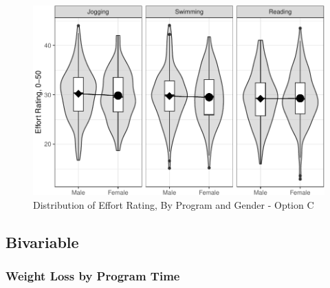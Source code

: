 \documentclass[
]{article}
\begin{document}
\begin{figure}[hb]

\includegraphics{Appendix_ex_weightloss_files/figure-latex/unnamed-chunk-61-1} \hfill{}

\caption{Distribution of Effort Rating, By Program and Gender - Option C}\label{fig:unnamed-chunk-61}
\end{figure}

\clearpage

\hypertarget{bivariable}{%
\subsection{Bivariable}\label{bivariable}}

\hypertarget{weight-loss-by-program-time}{%
\subsubsection{Weight Loss by Program
Time}\label{weight-loss-by-program-time}}
\end{document}
